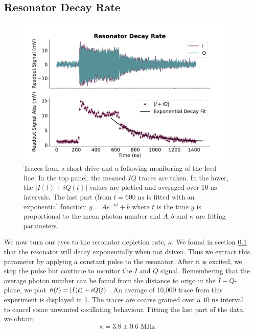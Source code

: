\subsection{Resonator Decay Rate}
\begin{figure}
    \centering
    \includegraphics{Calibrations/Figures/Resonator Decay Rate.pdf}
    \caption{Traces from a short drive and a following monitoring of the feed line. In the top panel, the meaned $IQ$ traces are taken. In the lower, the $|I(t) + iQ(t)|$ values are plotted and averaged over $10 \text{ ns}$ intervals. The last part (from $t = 600 \text{ ns}$ is fitted with an exponential function: $y = Ae^{-\kappa t} + b$ where $t$ is the time $y$ is proportional to the mean photon number and $A, b$ and $\kappa$ are fitting parameters.}
    \label{fig:calibration_of_kappa}
\end{figure}
We now turn our eyes to the resonator depletion rate, $\kappa$. We found in section \ref{} that the resonator will decay exponentially when not driven. Thus we extract this parameter by applying a constant pulse to the resonator. After it is excited, we stop the pulse but continue to monitor the $I$ and $Q$ signal. Remembering that the average photon number can be found from the distance to origo in the $I-Q$-plane, we plot $\Bar{n}(t) = |I(t)+iQ(t)|$. An average of 10,000 trace from this experiment is displayed in \ref{fig:calibration_of_kappa}. The traces are coarse grained over a $10 \text{ ns}$ interval to cancel some unwanted oscillating behaviour. Fitting the last part of the data, we obtain:
\begin{equation}
    \kappa = 3.8 \pm 0.6 \text{ MHz}
\end{equation}


